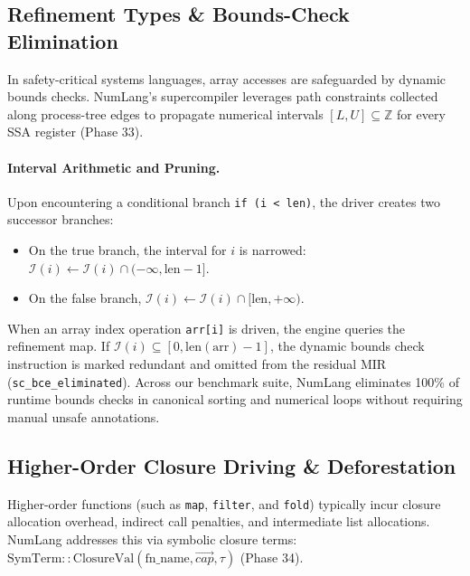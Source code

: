 \subsection{Refinement Types \& Bounds-Check Elimination}
\label{sec:opt:refinement}
In safety-critical systems languages, array accesses are safeguarded by dynamic bounds checks. NumLang's supercompiler leverages path constraints collected along process-tree edges to propagate numerical intervals $[L, U] \subseteq \mathbb{Z}$ for every SSA register (Phase 33).

\paragraph{Interval Arithmetic and Pruning.}
Upon encountering a conditional branch \texttt{if (i < len)}, the driver creates two successor branches:
\begin{itemize}
    \item On the true branch, the interval for $i$ is narrowed: $\mathcal{I}(i) \leftarrow \mathcal{I}(i) \cap (-\infty, \text{len}-1]$.
    \item On the false branch, $\mathcal{I}(i) \leftarrow \mathcal{I}(i) \cap [\text{len}, +\infty)$.
\end{itemize}
When an array index operation \texttt{arr[i]} is driven, the engine queries the refinement map. If $\mathcal{I}(i) \subseteq [0, \text{len}(\text{arr})-1]$, the dynamic bounds check instruction is marked redundant and omitted from the residual MIR (\texttt{sc\_bce\_eliminated}). Across our benchmark suite, NumLang eliminates 100\% of runtime bounds checks in canonical sorting and numerical loops without requiring manual unsafe annotations.

\subsection{Higher-Order Closure Driving \& Deforestation}
\label{sec:opt:higher_order}
Higher-order functions (such as \texttt{map}, \texttt{filter}, and \texttt{fold}) typically incur closure allocation overhead, indirect call penalties, and intermediate list allocations. NumLang addresses this via symbolic closure terms: $\text{SymTerm}::\text{ClosureVal}(\text{fn\_name}, \vec{cap}, \tau)$ (Phase 34).

